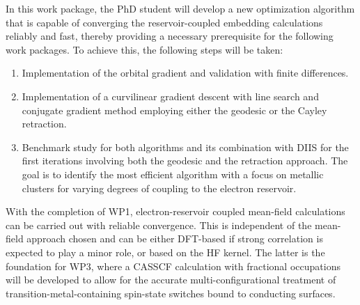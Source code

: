 \documentclass[a4paper,11pt,headings=normal]{scrartcl}
\begin{document}
In this work package, the PhD student will develop a new optimization algorithm that is capable of converging the reservoir-coupled embedding calculations reliably and fast, thereby providing a necessary prerequisite for the following work packages. To achieve this, the following steps will be taken:
\begin{enumerate}[itemsep=0pt, topsep=0pt]
\item Implementation of the orbital gradient and validation with finite differences.
\item Implementation of a curvilinear gradient descent with line search and conjugate gradient method employing either the geodesic or the Cayley retraction.\autocite{zhu2017}
\item Benchmark study for both algorithms and its combination with DIIS for the first iterations involving both the geodesic and the retraction approach. The goal is to identify the most efficient algorithm with a focus on metallic clusters for varying degrees of coupling to the electron reservoir.
\end{enumerate}
With the completion of WP1, electron-reservoir coupled mean-field calculations 
can be carried out with reliable convergence. This is independent of the 
mean-field approach chosen and can be either DFT-based if strong correlation is 
expected to play a minor role, or based on the HF kernel. 
The latter is the foundation for WP3, where a CASSCF calculation with fractional occupations will be developed to allow for the accurate multi-configurational treatment of transition-metal-containing spin-state switches bound to conducting surfaces.\\
\end{document}
